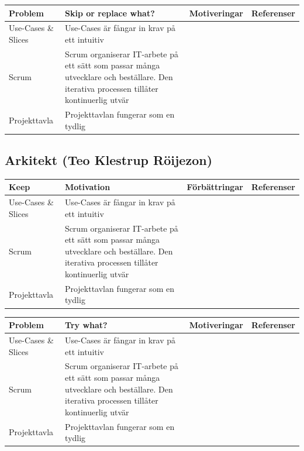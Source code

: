 \documentclass[conference,a4paper]{IEEEtran}
\newcommand\Tstrut{\rule{0pt}{2.6ex}}       %
\newcommand\Bstrut{\rule[-0.9ex]{0pt}{0pt}} %
\newcommand{\TBstrut}{\Tstrut\Bstrut} %
\begin{document}
\begin{table}[H]
	\small
  \centering
	\begin{tabular}{|p{1.5cm}|p{2cm}|p{1.8cm}|p{1.5cm}|} %
    \hline
    Problem & Skip or replace what? & Motiveringar & Referenser \TBstrut \\
    \hline
    Use-Cases \& Slices & Use-Cases är fångar in krav på ett intuitiv & & \TBstrut \\
    \hline
    Scrum & Scrum organiserar IT-arbete på ett sätt som passar många utvecklare och beställare. Den iterativa processen tillåter kontinuerlig utvär & & \TBstrut \\
    \hline
    Projekttavla & Projekttavlan fungerar som en tydlig & & \TBstrut \\
    \hline
  \end{tabular}
\end{table}

\subsection{Arkitekt (Teo Klestrup Röijezon)}
\begin{table}[H]
	\small
  \centering
	\begin{tabular}{|p{1.5cm}|p{2cm}|p{1.8cm}|p{1.5cm}|} %
    \hline
    Keep & Motivation & Förbättringar & Referenser \TBstrut \\
    \hline
    Use-Cases \& Slices & Use-Cases är fångar in krav på ett intuitiv & & \TBstrut \\
    \hline
    Scrum & Scrum organiserar IT-arbete på ett sätt som passar många utvecklare och beställare. Den iterativa processen tillåter kontinuerlig utvär & & \TBstrut \\
    \hline
    Projekttavla & Projekttavlan fungerar som en tydlig & & \TBstrut \\
    \hline
  \end{tabular}
\end{table}

\begin{table}[H]
	\small
  \centering
	\begin{tabular}{|p{1.5cm}|p{2cm}|p{1.8cm}|p{1.5cm}|} %
    \hline
    Problem & Try what? & Motiveringar & Referenser \TBstrut \\
    \hline
    Use-Cases \& Slices & Use-Cases är fångar in krav på ett intuitiv & & \TBstrut \\
    \hline
    Scrum & Scrum organiserar IT-arbete på ett sätt som passar många utvecklare och beställare. Den iterativa processen tillåter kontinuerlig utvär & & \TBstrut \\
    \hline
    Projekttavla & Projekttavlan fungerar som en tydlig & & \TBstrut \\
    \hline
  \end{tabular}
\end{table}
\end{document}
